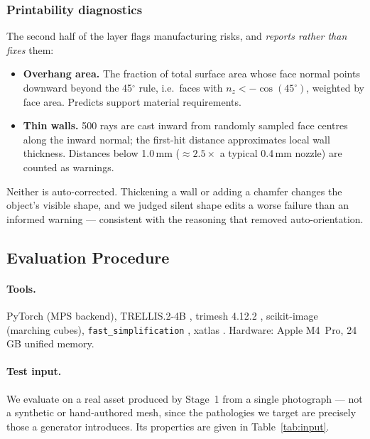 \documentclass[11pt,a4paper]{article}
\begin{document}
\subsubsection{Printability diagnostics}

The second half of the layer flags manufacturing risks, and \emph{reports
rather than fixes} them:

\begin{itemize}[leftmargin=*]
  \item \textbf{Overhang area.} The fraction of total surface area whose face
        normal points downward beyond the 45$^\circ$ rule, i.e.\ faces with
        $n_z < -\cos(45^\circ)$, weighted by face area. Predicts support
        material requirements.
  \item \textbf{Thin walls.} 500 rays are cast inward from randomly sampled
        face centres along the inward normal; the first-hit distance
        approximates local wall thickness. Distances below 1.0\,mm
        ($\approx 2.5\times$ a typical 0.4\,mm nozzle) are counted as warnings.
\end{itemize}

Neither is auto-corrected. Thickening a wall or adding a chamfer changes the
object's visible shape, and we judged silent shape edits a worse failure than
an informed warning --- consistent with the reasoning that removed
auto-orientation.

\subsection{Evaluation Procedure}
\label{sec:eval}

\paragraph{Tools.} PyTorch (MPS backend), TRELLIS.2-4B \cite{xiang2025trellis2},
trimesh 4.12.2 \cite{trimesh}, scikit-image (marching cubes),
\texttt{fast\_simplification} \cite{fastsimplification}, xatlas \cite{xatlas}.
Hardware: Apple M4~Pro, 24\,GB unified memory.

\paragraph{Test input.} We evaluate on a real asset produced by Stage~1 from a
single photograph --- not a synthetic or hand-authored mesh, since the
pathologies we target are precisely those a generator introduces. Its
properties are given in Table~\ref{tab:input}.
\end{document}
